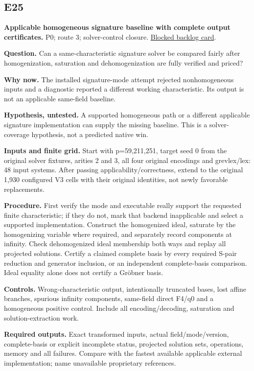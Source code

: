 \documentclass[
  10pt,
]{article}
\begin{document}
\subsection{E25}\label{e25}

\textbf{Applicable homogeneous signature baseline with complete output
certificates.} P0; route 3; solver-control closure.
\href{../../../backlog/XP-20261022-twist-homogeneous-solver-control/README.md}{Blocked
backlog card}.

\textbf{Question.} Can a same-characteristic signature solver be
compared fairly after homogenization, saturation and dehomogenization
are fully verified and priced?

\textbf{Why now.} The installed signature-mode attempt rejected
nonhomogeneous inputs and a diagnostic reported a different working
characteristic. Its output is not an applicable same-field baseline.

\textbf{Hypothesis, untested.} A supported homogeneous path or a
different applicable signature implementation can supply the missing
baseline. This is a solver-coverage hypothesis, not a predicted native
win.

\textbf{Inputs and finite grid.} Start with p=59,211,251, target seed 0
from the original solver fixtures, arities 2 and 3, all four original
encodings and grevlex/lex: 48 input systems. After passing
applicability/correctness, extend to the original 1,930 configured V3
cells with their original identities, not newly favorable replacements.

\textbf{Procedure.} First verify the mode and executable really support
the requested finite characteristic; if they do not, mark that backend
inapplicable and select a supported implementation. Construct the
homogenized ideal, saturate by the homogenizing variable where required,
and separately record components at infinity. Check dehomogenized ideal
membership both ways and replay all projected solutions. Certify a
claimed complete basis by every required S-pair reduction and generator
inclusion, or an independent complete-basis comparison. Ideal equality
alone does not certify a Gröbner basis.

\textbf{Controls.} Wrong-characteristic output, intentionally truncated
bases, lost affine branches, spurious infinity components, same-field
direct F4/q0 and a homogeneous positive control. Include all
encoding/decoding, saturation and solution-extraction work.

\textbf{Required outputs.} Exact transformed inputs, actual
field/mode/version, complete-basis or explicit incomplete status,
projected solution sets, operations, memory and all failures. Compare
with the fastest available applicable external implementation; name
unavailable proprietary references.
\end{document}
